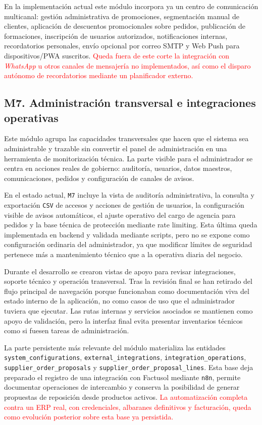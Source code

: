 En la implementación actual este módulo incorpora ya un centro de comunicación multicanal: gestión administrativa de promociones, segmentación manual de clientes, aplicación de descuentos promocionales sobre pedidos, publicación de formaciones, inscripción de usuarios autorizados, notificaciones internas, recordatorios personales, envío opcional por correo SMTP y Web Push para dispositivos/PWA suscritos. \textcolor{red}{Queda fuera de este corte la integración con \textit{WhatsApp} u otros canales de mensajería no implementados, así como el disparo autónomo de recordatorios mediante un planificador externo.}

\subsection{M7. Administración transversal e integraciones operativas}

Este módulo agrupa las capacidades transversales que hacen que el sistema sea administrable y trazable sin convertir el panel de administración en una herramienta de monitorización técnica. La parte visible para el administrador se centra en acciones reales de gobierno: auditoría, usuarios, datos maestros, comunicaciones, pedidos y configuración de canales de avisos.

En el estado actual, \texttt{M7} incluye la vista de auditoría administrativa, la consulta y exportación \texttt{CSV} de accesos y acciones de gestión de usuarios, la configuración visible de avisos automáticos, el ajuste operativo del cargo de agencia para pedidos y la base técnica de protección mediante rate limiting. Esta última queda implementada en backend y validada mediante scripts, pero no se expone como configuración ordinaria del administrador, ya que modificar límites de seguridad pertenece más a mantenimiento técnico que a la operativa diaria del negocio.

Durante el desarrollo se crearon vistas de apoyo para revisar integraciones, soporte técnico y operación transversal. Tras la revisión final se han retirado del flujo principal de navegación porque funcionaban como documentación viva del estado interno de la aplicación, no como casos de uso que el administrador tuviera que ejecutar. Las rutas internas y servicios asociados se mantienen como apoyo de validación, pero la interfaz final evita presentar inventarios técnicos como si fuesen tareas de administración.

La parte persistente más relevante del módulo materializa las entidades \texttt{system\_configurations}, \texttt{external\_integrations}, \texttt{integration\_operations}, \texttt{supplier\_order\_proposals} y \texttt{supplier\_order\_proposal\_lines}. Esta base deja preparado el registro de una integración con Factusol mediante \texttt{n8n}, permite documentar operaciones de intercambio y conserva la posibilidad de generar propuestas de reposición desde productos activos. \textcolor{red}{La automatización completa contra un ERP real, con credenciales, albaranes definitivos y facturación, queda como evolución posterior sobre esta base ya persistida.}

